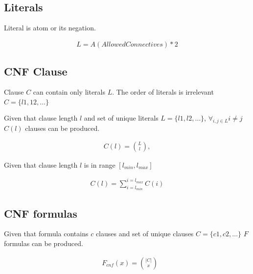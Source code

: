 \subsection{Literals}

Literal is atom or its negation.

\begin{align}
  L = A(AllowedConnectives) * 2
\end{align}

\subsection{CNF Clause}

Clause $C$ can contain only literals $L$. The order of literals is irrelevant $C = \{l1, 12, \dots\}$

Given that 
clause length $l$ and 
set of unique literals $L = \{l1, l2, \dots\}$, $\forall_{i,j \in L} i \neq j$
$C(l)$ clauses can be produced.

\begin{align}
  C(l) = \binom{L}{l},
\end{align}

Given that clause length $l$ is in range $[l_{min}, l_{max}]$

\begin{align}
  C(l) = \sum_{i=l_{min}}^{i=l_{max}} C(i)
\end{align}

\subsection{CNF formulas}

Given that
formula contains $c$ clauses and
set of unique clauses $C = \{c1,c2, \dots\}$
$F$ formulas can be produced.

\begin{align}
	&F_{cnf}(x) = \binom{|C|}{x}
\end{align}
